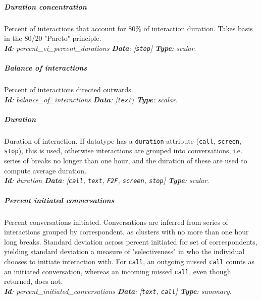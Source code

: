 
\subparagraph*{Duration concentration}
Percent of interactions that account for 80\% of interaction duration. Takes basis in the 80/20 "Pareto" principle. \\ \textit{\textbf{Id}: percent\_ei\_percent\_durations \textbf{Data}: [\texttt{\footnotesize stop}] \textbf{Type}: scalar}.

\subparagraph*{Balance of interactions}
Percent of interactions directed outwards. \\ \textit{\textbf{Id}: balance\_of\_interactions \textbf{Data}: [\texttt{\footnotesize text}] \textbf{Type}: scalar}.

\subparagraph*{Duration}
Duration of interaction. If datatype has a \texttt{\small duration}-attribute (\texttt{\small call}, \texttt{\small screen}, \texttt{\small stop}), this is used, otherwise interactions are grouped into conversations, i.e. series of breaks no longer than one hour, and the duration of these are used to compute average duration.
\\ \textit{\textbf{Id}: duration \textbf{Data}: [\texttt{\footnotesize call}, \texttt{\footnotesize text}, \texttt{\footnotesize F2F}, \texttt{\footnotesize screen}, \texttt{\footnotesize stop}] \textbf{Type}: scalar}.

\subparagraph*{Percent initiated conversations}
Percent conversations initiated. Conversations are inferred from series of interactions grouped by correspondent, as clusters with no more than one hour long breaks. Standard deviation across percent initiated for set of correspondents, yielding standard deviation a measure of "selectiveness" in who the individual chooses to initiate interaction with. For \texttt{\small call}, an outgoing missed \texttt{\small call} counts as an initiated conversation, whereas an incoming missed \texttt{\small call}, even though returned, does not.\\ \textit{\textbf{Id}: percent\_initiated\_conversations \textbf{Data}: [\texttt{\footnotesize text}, \texttt{\footnotesize call}] \textbf{Type}: summary}.

